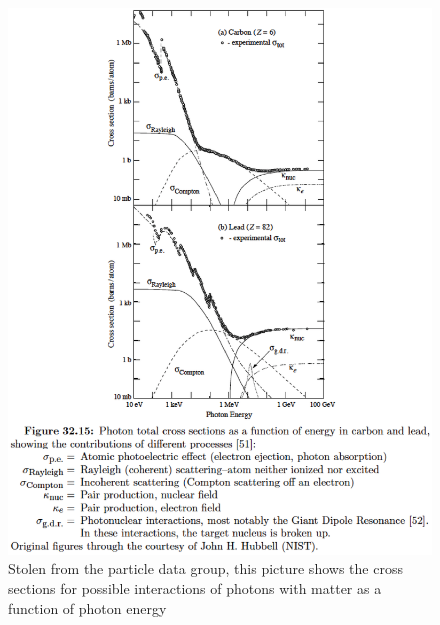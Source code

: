 \begin{figure}[h]
\centering\includegraphics[scale=0.5]{./particleinteractions/Pictures/photoninteractions.eps}
\caption{Stolen from the particle data group, this picture shows the cross sections for possible interactions of photons with matter as a function of photon energy }
\label{fig:photoninteractions}
\end{figure}

